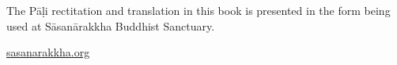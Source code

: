 \clearpage
\thispagestyle{empty}

\mbox{}
\vfill

{\centering

  
  The Pāḷi rectitation and translation in this book is presented in the form being
  used at Sāsanārakkha Buddhist Sanctuary.

  \href{https://sasanarakkha.org/}{sasanarakkha.org}

}

\vfill
\vspace*{5em}
\mbox{}

